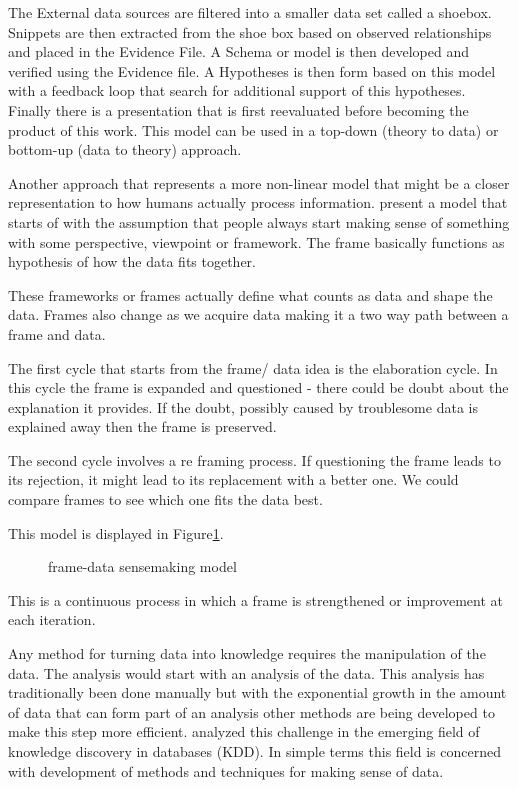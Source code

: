 The External data sources are filtered into a smaller data set called a shoebox. Snippets are then extracted from the shoe box based on observed relationships and placed in the Evidence File. A Schema or model is then developed and verified using the Evidence file. A Hypotheses is then form based on this model with a feedback loop that search for additional support of this hypotheses. Finally there is a presentation that is first reevaluated before becoming the product of this work. This model can be used in a top-down (theory to data)  or bottom-up (data to theory) approach.

Another approach that represents a more non-linear model that might be a closer representation to how humans actually process information. \cite{klein2006making} present a model that starts of with the assumption that people always start making sense of something with some perspective, viewpoint or framework. The frame basically functions as hypothesis of how the data fits together.

These frameworks or frames actually define what counts as data and shape the data. Frames also change as we acquire data making it a two way path between a frame and data.

The first cycle that starts from the frame/ data idea is the elaboration cycle. In this cycle the frame is expanded and questioned - there could be doubt about the explanation it provides. If the doubt, possibly caused by troublesome data is explained away then the frame is preserved.

The second cycle involves a re framing process. If questioning the frame leads to its rejection, it might lead to its replacement with a better one. We could compare frames to see which one fits the data best. 

This model is displayed in Figure\ref{fig:4}.
\begin{figure}[!ht]
	\centering{}
	\caption{\cite{klein2006making} frame-data sensemaking model}\label{fig:4}
\end{figure}

This is a continuous process in which a frame is strengthened or improvement at each iteration.

Any method for turning data into knowledge requires the manipulation of the data. The analysis would start with an analysis of the data. This analysis has traditionally been done manually but with the exponential growth in the amount of data that can form part of an analysis other methods are being developed to make this step more efficient. \cite{fayyad1996data} analyzed this challenge in the emerging field of knowledge discovery in databases (KDD). In simple terms this field is concerned with development of methods and techniques for making sense of data.


